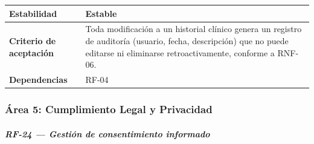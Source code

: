 {\def\LTcaptype{none} %
\begin{longtable}[]{@{}
  >{\raggedright\arraybackslash}p{}
  >{\raggedright\arraybackslash}p{}@{}}
\toprule\noalign{}
\begin{minipage}[b]{\linewidth}\raggedright
\textbf{Estabilidad}
\end{minipage} & \begin{minipage}[b]{\linewidth}\raggedright
Estable
\end{minipage} \\
\midrule\noalign{}
\endhead
\bottomrule\noalign{}
\endlastfoot
\textbf{Criterio de aceptación} &
\begin{minipage}[t]{\linewidth}\raggedright
Toda modificación a un historial clínico genera un registro de auditoría
(usuario, fecha, descripción) que no puede editarse ni eliminarse
retroactivamente, conforme a RNF-06.
\end{minipage} \\
\textbf{Dependencias} & \begin{minipage}[t]{\linewidth}\raggedright
RF-04
\end{minipage} \\
\end{longtable}
}

\subsubsection{Área 5: Cumplimiento Legal y
Privacidad}\label{uxe1rea-5-cumplimiento-legal-y-privacidad}

\subparagraph{RF-24 --- Gestión de consentimiento
informado}\label{rf-24-gestion-de-consentimiento-informado}

